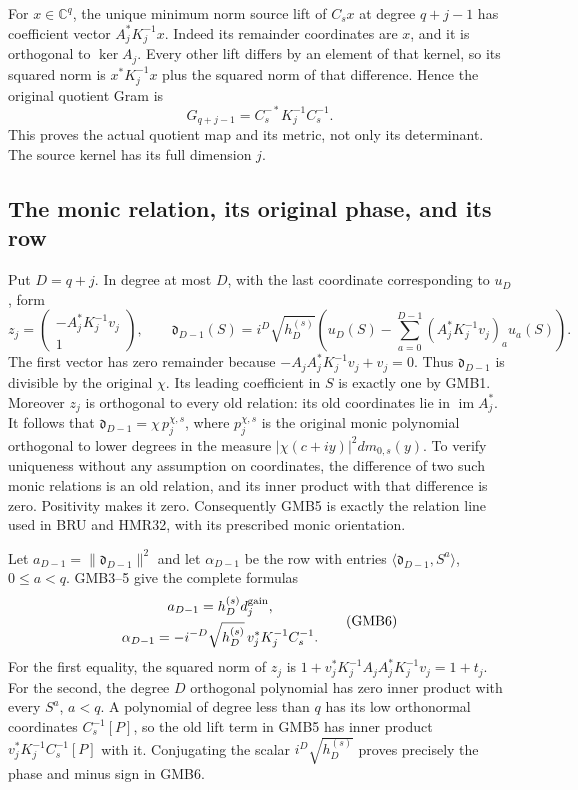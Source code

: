 \documentclass[11pt,a4paper]{article}
\begin{document}
For $x\in\mathbb C^q$, the unique minimum norm source lift of $C_sx$
at degree $q+j-1$ has coefficient vector
$A_j^*K_j^{-1}x$. Indeed its remainder coordinates are $x$,
and it is orthogonal to $\ker A_j$. Every other lift differs by
an element of that kernel, so its squared norm is
$x^*K_j^{-1}x$ plus the squared norm of that difference. Hence the
original quotient Gram is
\[
 G_{q+j-1}=C_s^{-*}K_j^{-1}C_s^{-1}.
 \tag{GMB4}
\]
This proves the actual quotient map and its metric, not only its
determinant. The source kernel has its full dimension $j$.

\subsection{The monic relation, its original phase, and its row}
Put $D=q+j$. In degree at most $D$, with the last coordinate
corresponding to $u_D$, form
\[
 z_j=\begin{pmatrix}-A_j^*K_j^{-1}v_j\\1\end{pmatrix},\qquad
 \mathfrak d_{D-1}(S)
   =i^D\sqrt{h_D^{(s)}}\left(
       u_D(S)-\sum_{a=0}^{D-1}(A_j^*K_j^{-1}v_j)_a u_a(S)
                         \right).
 \tag{GMB5}
\]
The first vector has zero remainder because
$-A_jA_j^*K_j^{-1}v_j+v_j=0$. Thus $\mathfrak d_{D-1}$ is
divisible by the original $\chi$. Its leading coefficient in $S$
is exactly one by GMB1. Moreover $z_j$ is orthogonal to every
old relation: its old coordinates lie in $\operatorname{im}A_j^*$.
It follows that $\mathfrak d_{D-1}=\chi\,p_j^{\chi,s}$, where
$p_j^{\chi,s}$ is the original monic polynomial orthogonal to lower
degrees in the measure $|\chi(c+iy)|^2dm_{0,s}(y)$. To verify
uniqueness without any assumption on coordinates, the difference
of two such monic relations is an old relation, and its inner
product with that difference is zero. Positivity makes it zero.
Consequently GMB5 is exactly the relation line used in BRU and
HMR32, with its prescribed monic orientation.

Let $a_{D-1}=\|\mathfrak d_{D-1}\|^2$ and let
$\alpha_{D-1}$ be the row with entries
$\langle\mathfrak d_{D-1},S^a\rangle$, $0\leq a<q$.
GMB3--5 give the complete formulas
\[
\begin{gathered}
 a_{D-1}=h_D^{(s)}d_j^{\rm gain},\\
 \alpha_{D-1}
   =-i^{-D}\sqrt{h_D^{(s)}}\,v_j^*K_j^{-1}C_s^{-1}.
\end{gathered}\tag{GMB6}
\]
For the first equality, the squared norm of $z_j$ is
$1+v_j^*K_j^{-1}A_jA_j^*K_j^{-1}v_j=1+t_j$.
For the second, the degree $D$ orthogonal polynomial has zero
inner product with every $S^a$, $a<q$. A polynomial of degree
less than $q$ has its low orthonormal coordinates $C_s^{-1}[P]$,
so the old lift term in GMB5 has inner product
$v_j^*K_j^{-1}C_s^{-1}[P]$ with it. Conjugating the scalar
$i^D\sqrt{h_D^{(s)}}$ proves precisely the phase and minus sign
in GMB6.
\end{document}
